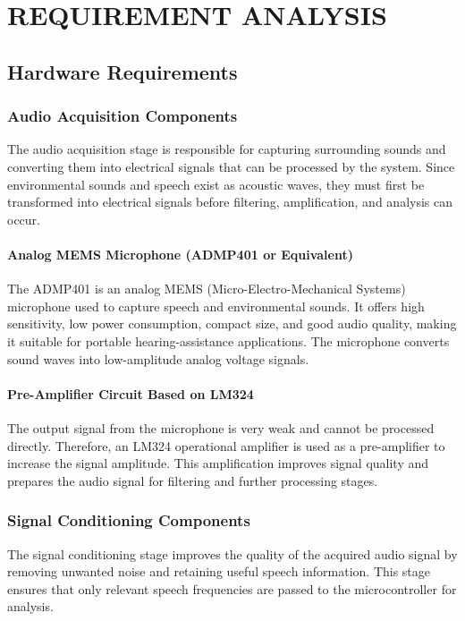 \chapter{REQUIREMENT ANALYSIS}

\section{Hardware Requirements}

\subsection{Audio Acquisition Components}
The audio acquisition stage is responsible for capturing surrounding sounds and converting them into electrical signals that can be processed by the system. Since environmental sounds and speech exist as acoustic waves, they must first be transformed into electrical signals before filtering, amplification, and analysis can occur.

\subsubsection{Analog MEMS Microphone (ADMP401 or Equivalent)}

The ADMP401 is an analog MEMS (Micro-Electro-Mechanical Systems) microphone used to capture speech and environmental sounds. It offers high sensitivity, low power consumption, compact size, and good audio quality, making it suitable for portable hearing-assistance applications. The microphone converts sound waves into low-amplitude analog voltage signals.

\subsubsection{Pre-Amplifier Circuit Based on LM324}

The output signal from the microphone is very weak and cannot be processed directly. Therefore, an LM324 operational amplifier is used as a pre-amplifier to increase the signal amplitude. This amplification improves signal quality and prepares the audio signal for filtering and further processing stages.

\subsection{Signal Conditioning Components}
The signal conditioning stage improves the quality of the acquired audio signal by removing unwanted noise and retaining useful speech information. This stage ensures that only relevant speech frequencies are passed to the microcontroller for analysis.


